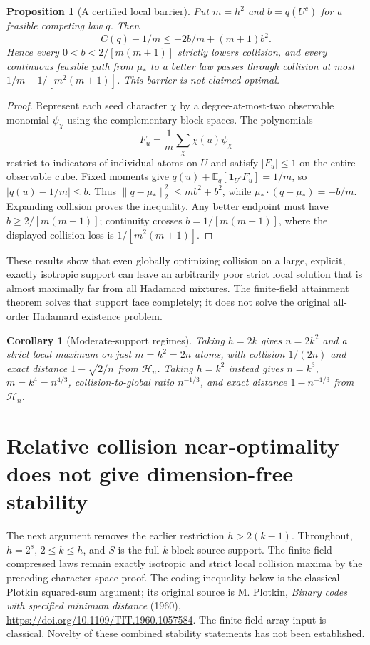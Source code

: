 \documentclass[11pt]{article}
\newtheorem{corollary}[theorem]{Corollary}
\newtheorem{proposition}[theorem]{Proposition}
\begin{document}
\begin{proposition}[A certified local barrier]
\label{prop:design-concentrated-barrier}
Put $m=h^2$ and $b=q(U^c)$ for a feasible competing law $q$. Then
\[
 C(q)-1/m\le-2b/m+(m+1)b^2.
\]
Hence every $0<b<2/[m(m+1)]$ strictly lowers collision, and every
continuous feasible path from $\mu_*$ to a better law passes through
collision at most $1/m-1/[m^2(m+1)]$. This barrier is not claimed optimal.
\end{proposition}
\begin{proof}
Represent each seed character $\chi$ by a degree-at-most-two observable
monomial $\psi_\chi$ using the complementary block spaces. The polynomials
\[
 F_u=\frac1m\sum_\chi\chi(u)\psi_\chi
\]
restrict to indicators of individual atoms on $U$ and satisfy
$|F_u|\le1$ on the entire observable cube. Fixed moments give
$q(u)+\mathbb E_q[\mathbf1_{U^c}F_u]=1/m$, so
$|q(u)-1/m|\le b$. Thus
$\|q-\mu_*\|_2^2\le mb^2+b^2$, while
$\mu_*\cdot(q-\mu_*)=-b/m$. Expanding collision proves the inequality.
Any better endpoint must have $b\ge2/[m(m+1)]$; continuity crosses
$b=1/[m(m+1)]$, where the displayed collision loss is $1/[m^2(m+1)]$.
\end{proof}

These results show that even globally optimizing collision on a large,
explicit, exactly isotropic support can leave an arbitrarily poor strict
local solution that is almost maximally far from all Hadamard mixtures.
The finite-field attainment theorem solves that support face completely;
it does not solve the original all-order Hadamard existence problem.

\begin{corollary}[Moderate-support regimes]
\label{cor:design-moderate-support}
Taking $h=2k$ gives $n=2k^2$ and a strict local maximum on just
$m=h^2=2n$ atoms, with collision $1/(2n)$ and exact distance
$1-\sqrt{2/n}$ from $\mathcal H_n$. Taking $h=k^2$ instead gives
$n=k^3$, $m=k^4=n^{4/3}$, collision-to-global ratio $n^{-1/3}$,
and exact distance $1-n^{-1/3}$ from $\mathcal H_n$.
\end{corollary}
\section{Relative collision near-optimality does not give dimension-free stability}
\label{sec:design-relative-stability}
The next argument removes the earlier restriction $h>2(k-1)$.
Throughout, $h=2^s$, $2\le k\le h$, and $S$ is the full $k$-block source
support. The finite-field compressed laws remain exactly isotropic and
strict local collision maxima by the preceding character-space proof.
The coding inequality below is the classical Plotkin squared-sum argument;
its original source is M. Plotkin, \emph{Binary codes with specified
minimum distance} (1960), \url{https://doi.org/10.1109/TIT.1960.1057584}.
The finite-field array input is classical. Novelty of these combined
stability statements has not been established.
\end{document}
